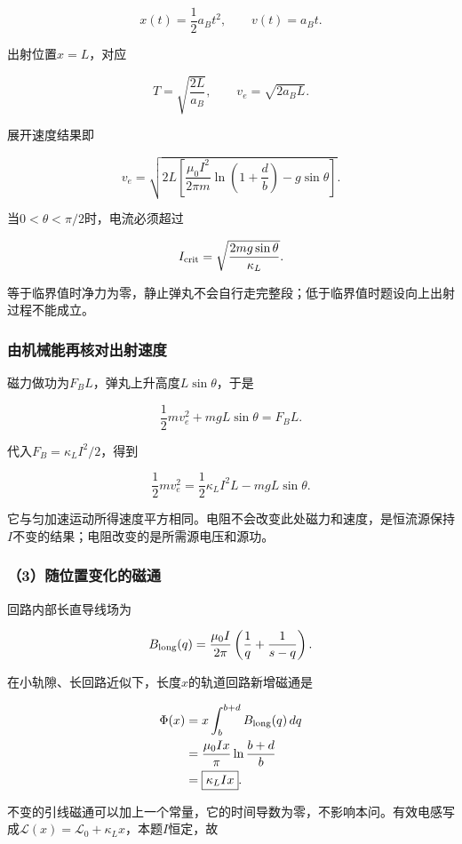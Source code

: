 \documentclass[12pt,a4paper,fontset=fandol]{ctexart}
\begin{document}
\[
x(t)=\frac12a_Bt^2,\qquad v(t)=a_Bt.
\]

出射位置\(x=L\)，对应

\[
\boxed{
T=\sqrt{\frac{2L}{a_B}},
\qquad
v_e=\sqrt{2a_BL}}.
\]

展开速度结果即

\[
\boxed{
v_e=\sqrt{2L\left[
\frac{\mu_0I^2}{2\pi m}\ln\left(1+\frac db\right)
-g\sin\theta\right]}}.
\]

当\(0<\theta<\pi/2\)时，电流必须超过

\[
I_{\rm crit}=
\sqrt{\frac{2mg\sin\theta}{\kappa_L}}.
\]

等于临界值时净力为零，静止弹丸不会自行走完整段；低于临界值时题设向上出射过程不能成立。

\subsubsection{由机械能再核对出射速度}\label{ux7531ux673aux68b0ux80fdux518dux6838ux5bf9ux51faux5c04ux901fux5ea6}

磁力做功为\(F_BL\)，弹丸上升高度\(L\sin\theta\)，于是

\[
\frac12mv_e^2+mgL\sin\theta=F_BL.
\]

代入\(F_B=\kappa_LI^2/2\)，得到

\[
\frac12mv_e^2
=\frac12\kappa_LI^2L-mgL\sin\theta.
\]

它与匀加速运动所得速度平方相同。电阻不会改变此处磁力和速度，是恒流源保持\(I\)不变的结果；电阻改变的是所需源电压和源功。

\subsubsection{（3）随位置变化的磁通}\label{ux968fux4f4dux7f6eux53d8ux5316ux7684ux78c1ux901a}

回路内部长直导线场为

\[
B_{\rm long}(q)=\frac{\mu_0I}{2\pi}
\left(\frac1q+\frac1{s-q}\right).
\]

在小轨隙、长回路近似下，长度\(x\)的轨道回路新增磁通是

\[
\begin{aligned}
\Phi(x)
&=x\int_b^{b+d} B_{\rm long}(q)\,dq\\
&=\frac{\mu_0Ix}{\pi}\ln\frac{b+d}{b}\\
&=\boxed{\kappa_LIx}.
\end{aligned}
\]

不变的引线磁通可以加上一个常量，它的时间导数为零，不影响本问。有效电感写成\(\mathcal L(x)=\mathcal L_0+\kappa_Lx\)，本题\(I\)恒定，故
\end{document}
